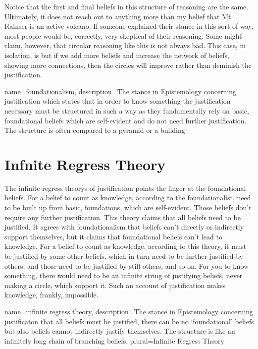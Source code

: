 Notice that the first and final beliefs in this structure of reasoning are the same. Ultimately, it does not reach out to anything more than my belief that Mt. Rainser is an active volcano. If someone explained their stance in this sort of way, most people would be, correctly, very skeptical of their reasoning. Some might claim, however, that circular reasoning like this is not always bad. This case, in isolation, is but if we add more beliefs and increase the network of beliefs, showing more connections, then the circles will improve rather than deminish the justification. 

{
name=foundationalism,
description={The stance in Epistemology concerning justification which states that in order to know something the justification necessary must be structured in such a way as they fundamentally rely on basic, foundational beliefs which are self-evident and do not need further justification. The structure is often compared to a pyramid or a building}
}


\section{Infnite Regress Theory}

The \glspl{infinite regress theory} of justification points the finger at the foundational beliefs. For a belief to count as knowledge, according to the foundationalist, need to be built up from basic, foundations, which are self-evident. Those beliefs don't require any further justification. This theory claims that all beliefs need to be justified. It agrees with foundationalism that beliefs can't directly or indirectly support themselves, but it claims that foundational beliefs can't lead to knowledge. For a belief to count as knowledge, according to this theory, it must be justified by some other beliefs, which in turn need to be further justified by others, and those need to be justified by still others, and so on. For you to know something, there would need to be an infinite string of justifying beliefs, never making a circle, which support it. Such an account of justification makes knowledge, frankly, impossible.

{
name=infinite regress theory,
description={The stance in Epistemology concerning justificaton that all beliefs must be justified, there can be no `foundational' beliefs but also beliefs cannot indirectly justify themselves. The structure is like an infinitely long chain of branching beliefs},
plural=Infinite Regress Theory
}


